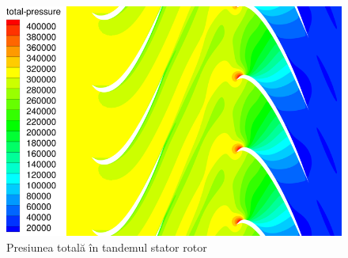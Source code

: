 \begin{figure}
	\centering
	\includegraphics[scale=1]{figures/presiunea-totala.png}
	\caption{Presiunea totală în tandemul stator rotor}
	\label{Presiunea totală în tandemul stator rotor}
\end{figure}